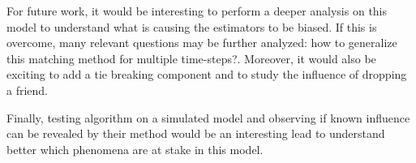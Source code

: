 \documentclass[11pt]{article}
\begin{document}
For future work, it would be interesting to perform a deeper analysis on this model to understand what is causing the estimators to be biased. If this is overcome, many relevant questions may be further analyzed: how to generalize this matching method for multiple time-steps?. Moreover, it would also be exciting to add a tie breaking component and to study the influence of dropping a friend.

Finally, testing \citep{aral2009distinguishing} algorithm on a simulated model and observing if known influence can be revealed by their method would be an interesting lead to understand better which phenomena are at stake in this model.
	

\newpage


\nocite{*}
\end{document}
